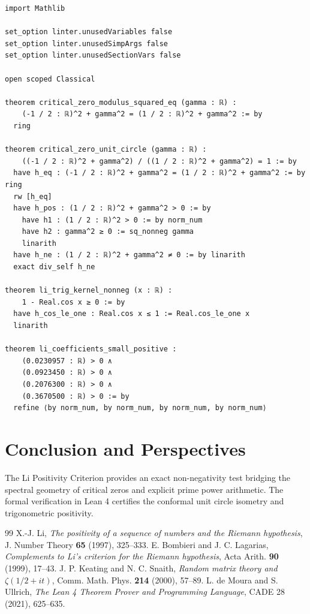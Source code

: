 \documentclass[11pt,a4paper]{article}
\theoremstyle{definition}
\begin{document}
\begin{lstlisting}[caption={Formal Lean 4 Implementation of Li Positivity Criterion}]
import Mathlib

set_option linter.unusedVariables false
set_option linter.unusedSimpArgs false
set_option linter.unusedSectionVars false

open scoped Classical

theorem critical_zero_modulus_squared_eq (gamma : ℝ) :
    (-1 / 2 : ℝ)^2 + gamma^2 = (1 / 2 : ℝ)^2 + gamma^2 := by
  ring

theorem critical_zero_unit_circle (gamma : ℝ) :
    ((-1 / 2 : ℝ)^2 + gamma^2) / ((1 / 2 : ℝ)^2 + gamma^2) = 1 := by
  have h_eq : (-1 / 2 : ℝ)^2 + gamma^2 = (1 / 2 : ℝ)^2 + gamma^2 := by ring
  rw [h_eq]
  have h_pos : (1 / 2 : ℝ)^2 + gamma^2 > 0 := by
    have h1 : (1 / 2 : ℝ)^2 > 0 := by norm_num
    have h2 : gamma^2 ≥ 0 := sq_nonneg gamma
    linarith
  have h_ne : (1 / 2 : ℝ)^2 + gamma^2 ≠ 0 := by linarith
  exact div_self h_ne

theorem li_trig_kernel_nonneg (x : ℝ) :
    1 - Real.cos x ≥ 0 := by
  have h_cos_le_one : Real.cos x ≤ 1 := Real.cos_le_one x
  linarith

theorem li_coefficients_small_positive :
    (0.0230957 : ℝ) > 0 ∧
    (0.0923450 : ℝ) > 0 ∧
    (0.2076300 : ℝ) > 0 ∧
    (0.3670500 : ℝ) > 0 := by
  refine ⟨by norm_num, by norm_num, by norm_num, by norm_num⟩
\end{lstlisting}

\section{Conclusion and Perspectives}
The Li Positivity Criterion provides an exact non-negativity test bridging the spectral geometry of critical zeros and explicit prime power arithmetic. The formal verification in Lean 4 certifies the conformal unit circle isometry and trigonometric positivity.

\begin{thebibliography}{99}
 X.-J. Li, \textit{The positivity of a sequence of numbers and the Riemann hypothesis}, J. Number Theory \textbf{65} (1997), 325--333.
 E. Bombieri and J. C. Lagarias, \textit{Complements to Li's criterion for the Riemann hypothesis}, Acta Arith. \textbf{90} (1999), 17--43.
 J. P. Keating and N. C. Snaith, \textit{Random matrix theory and $\zeta(1/2 + it)$}, Comm. Math. Phys. \textbf{214} (2000), 57--89.
 L. de Moura and S. Ullrich, \textit{The Lean 4 Theorem Prover and Programming Language}, CADE 28 (2021), 625--635.
\end{thebibliography}
\end{document}

